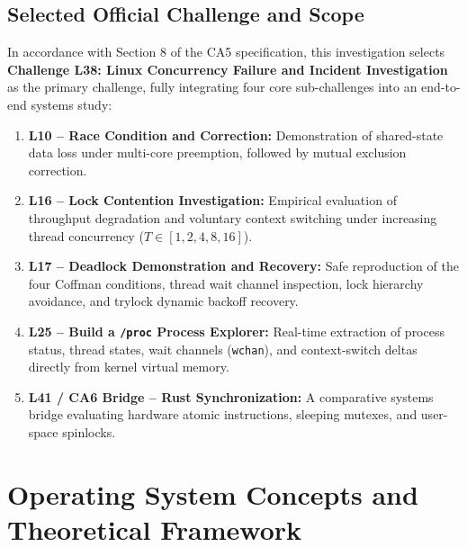 \documentclass[11pt,a4paper]{article}
\begin{document}
\subsection{Selected Official Challenge and Scope}
In accordance with Section 8 of the CA5 specification, this investigation selects \textbf{Challenge L38: Linux Concurrency Failure and Incident Investigation} as the primary challenge, fully integrating four core sub-challenges into an end-to-end systems study:
\begin{enumerate}
    \item \textbf{L10 -- Race Condition and Correction:} Demonstration of shared-state data loss under multi-core preemption, followed by mutual exclusion correction.
    \item \textbf{L16 -- Lock Contention Investigation:} Empirical evaluation of throughput degradation and voluntary context switching under increasing thread concurrency ($T \in [1, 2, 4, 8, 16]$).
    \item \textbf{L17 -- Deadlock Demonstration and Recovery:} Safe reproduction of the four Coffman conditions, thread wait channel inspection, lock hierarchy avoidance, and trylock dynamic backoff recovery.
    \item \textbf{L25 -- Build a \texttt{/proc} Process Explorer:} Real-time extraction of process status, thread states, wait channels (\texttt{wchan}), and context-switch deltas directly from kernel virtual memory.
    \item \textbf{L41 / CA6 Bridge -- Rust Synchronization:} A comparative systems bridge evaluating hardware atomic instructions, sleeping mutexes, and user-space spinlocks.
\end{enumerate}

\section{Operating System Concepts and Theoretical Framework}
\end{document}
